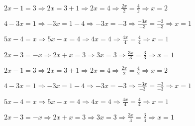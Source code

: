 \begin{alist}
\item $ 2x-1=3\Rightarrow 2x=3+1\Rightarrow 2x=4\Rightarrow \frac{2x}{2}=\frac{4}{2}\Rightarrow x=2 $
\item $ 4-3x=1\Rightarrow -3x=1-4\Rightarrow -3x=-3\Rightarrow \frac{-3x}{-3}=\frac{-3}{-3}\Rightarrow x=1 $
\item $ 5x-4=x\Rightarrow 5x-x=4\Rightarrow 4x=4\Rightarrow \frac{4x}{4}=\frac{4}{4}\Rightarrow x=1 $
\item $ 2x-3=-x\Rightarrow 2x+x=3\Rightarrow 3x=3\Rightarrow \frac{3x}{3}=\frac{3}{3}\Rightarrow x=1 $
\end{alist}
\begin{alist}
\item $ 2x-1=3\Rightarrow 2x=3+1\Rightarrow 2x=4\Rightarrow \frac{2x}{2}=\frac{4}{2}\Rightarrow x=2 $
\item $ 4-3x=1\Rightarrow -3x=1-4\Rightarrow -3x=-3\Rightarrow \frac{-3x}{-3}=\frac{-3}{-3}\Rightarrow x=1 $
\item $ 5x-4=x\Rightarrow 5x-x=4\Rightarrow 4x=4\Rightarrow \frac{4x}{4}=\frac{4}{4}\Rightarrow x=1 $
\item $ 2x-3=-x\Rightarrow 2x+x=3\Rightarrow 3x=3\Rightarrow \frac{3x}{3}=\frac{3}{3}\Rightarrow x=1 $
\end{alist}
